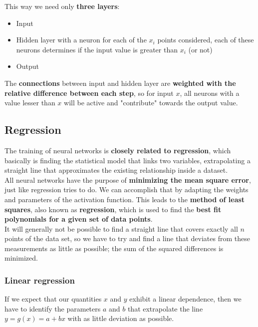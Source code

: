 \documentclass[11pt]{article}
\begin{document}
		This way we need only \textbf{three layers}: 
		\begin{itemize}
			\item Input \\
			\item Hidden layer with a neuron for each of the $x_i$ points considered, each of these neurons determines if the input value is greater than $x_i$ (or not) \\
			\item Output \\
		\end{itemize}
		
		The \textbf{connections} between input and hidden layer are \textbf{weighted with the relative difference between each step}, so for input $x$, all neurons with a value lesser than $x$ will be active and "contribute" towards the output value.\\
		
		
		\newpage
		
		\subsection{Regression}
		The training of neural networks is \textbf{closely related to regression}, which basically is finding the statistical model that links two variables, extrapolating a straight line that approximates the existing relationship inside a dataset.\\
		
		All neural networks have the purpose of \textbf{minimizing the mean square error}, just like regression tries to do. We can accomplish that by adapting the weights and parameters of the activation function. This leads to the \textbf{method of least squares}, also known as \textbf{regression}, which is used to find the \textbf{best fit polynomials for a given set of data points}.\\
		
		It will generally not be possible to find a straight line that covers exactly all $n$ points of the data set, so we have to try and find a line that deviates from these measurements as little as possible; the sum of the squared differences is minimized.\\
		
		\subsubsection{Linear regression}
		If we expect that our quantities $x$ and $y$ exhibit a linear dependence, then we have to identify the parameters $a$ and $b$ that extrapolate the line $y = g(x) = a + bx$ with as little deviation as possible.\\
		
\end{document}
